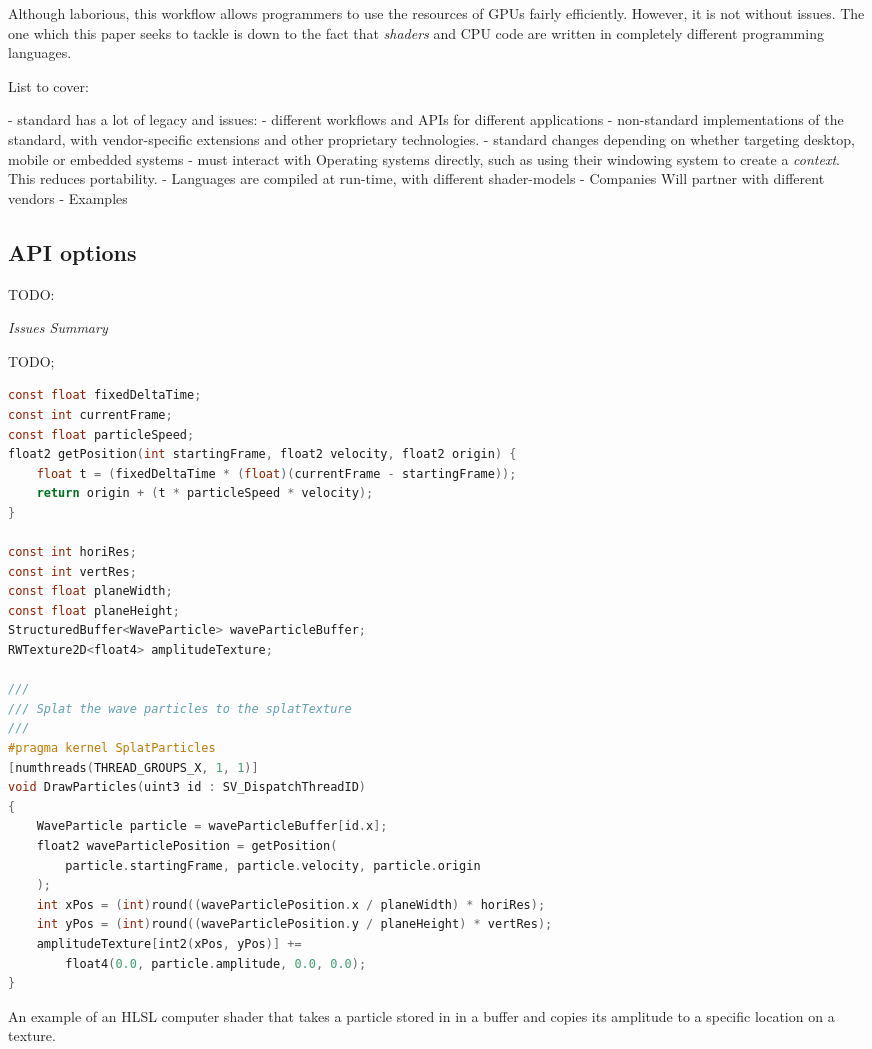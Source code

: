 \documentclass[a4paper,12pt,twoside,openright]{report}
\begin{document}
Although laborious, this workflow allows programmers to use the resources of
GPUs fairly efficiently. However, it is not without issues. The one which this
paper seeks to tackle is down to the fact that \textit{shaders} and CPU code
are written in completely different programming languages.

List to cover:

 - standard has a lot of legacy and issues:
    - different workflows and APIs for different applications
    - non-standard implementations of the standard, with vendor-specific extensions
    and other proprietary technologies.
    - standard changes depending on whether targeting desktop, mobile or
    embedded systems
    - must interact with Operating systems directly, such as using their windowing
    system to create a \textit{context}. This reduces portability.
    - Languages are compiled at run-time, with different shader-models
    - Companies Will partner with different vendors
    - Examples

\subsection{API options}

\label{sec:api_options}

TODO:


\textit{Issues Summary}

TODO;

\begin{lstfloat}
\begin{lstlisting}[language=C]
const float fixedDeltaTime;
const int currentFrame;
const float particleSpeed;
float2 getPosition(int startingFrame, float2 velocity, float2 origin) {
    float t = (fixedDeltaTime * (float)(currentFrame - startingFrame));
    return origin + (t * particleSpeed * velocity);
}

const int horiRes;
const int vertRes;
const float planeWidth;
const float planeHeight;
StructuredBuffer<WaveParticle> waveParticleBuffer;
RWTexture2D<float4> amplitudeTexture;

///
/// Splat the wave particles to the splatTexture
///
#pragma kernel SplatParticles
[numthreads(THREAD_GROUPS_X, 1, 1)]
void DrawParticles(uint3 id : SV_DispatchThreadID)
{
    WaveParticle particle = waveParticleBuffer[id.x];
    float2 waveParticlePosition = getPosition(
        particle.startingFrame, particle.velocity, particle.origin
    );
    int xPos = (int)round((waveParticlePosition.x / planeWidth) * horiRes);
    int yPos = (int)round((waveParticlePosition.y / planeHeight) * vertRes);
    amplitudeTexture[int2(xPos, yPos)] +=
        float4(0.0, particle.amplitude, 0.0, 0.0);
}
\end{lstlisting}
\label{lst:draw_particles}
\caption{An example of an HLSL computer shader that takes a particle stored in
in a buffer and copies its amplitude to a specific location on a texture.}
\end{lstfloat}
\end{document}

